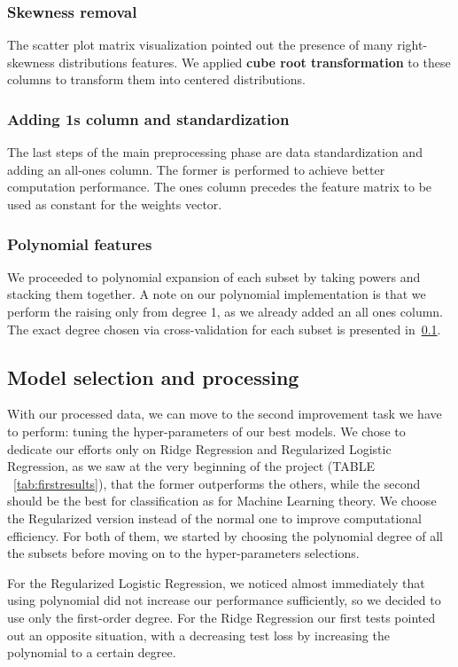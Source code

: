 \documentclass[10pt,article]{IEEEtran}
\begin{document}
\subsubsection{Skewness removal} The scatter plot matrix visualization pointed out the presence of many right-skewness distributions features. We applied \textbf{cube root transformation} to these columns to transform them into centered distributions.
\subsubsection{Adding 1s column and standardization} The last steps of the main preprocessing phase are data standardization and adding an all-ones column. The former is performed to achieve better computation performance. The ones column precedes the feature matrix to be used as constant for the weights vector.
\subsubsection{Polynomial features} We proceeded to polynomial expansion of each subset by taking powers and stacking them together. A note on our polynomial implementation is that we perform the raising only from degree 1, as we already added an all ones column. The exact degree chosen via cross-validation for each subset is presented in~\ref{subsec:model-proc}.

\subsection{Model selection and processing}
\label{subsec:model-proc}
With our processed data, we can move to the second improvement task we have to perform: tuning the hyper-parameters of our best models.
We chose to dedicate our efforts only on Ridge Regression and Regularized Logistic Regression, as we saw at the very beginning of the project (TABLE ~\ref{tab:firstresults}), that the former outperforms the others, while the second should be the best for classification as for Machine Learning theory. We choose the Regularized version instead of the normal one to improve computational efficiency. For both of them, we started by choosing the polynomial degree of all the subsets before moving on to the hyper-parameters selections.

For the Regularized Logistic Regression, we noticed almost immediately that using polynomial did not increase our performance sufficiently, so we decided to use only the first-order degree. For the Ridge Regression our first tests pointed out an opposite situation, with a decreasing test loss by increasing the polynomial to a certain degree. 
\end{document}
